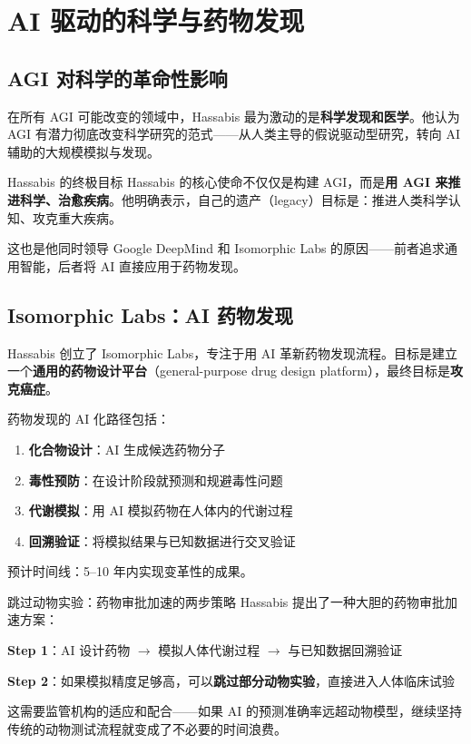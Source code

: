 \section{AI 驱动的科学与药物发现}

\subsection{AGI 对科学的革命性影响}

在所有 AGI 可能改变的领域中，Hassabis 最为激动的是\textbf{科学发现和医学}。他认为 AGI 有潜力彻底改变科学研究的范式——从人类主导的假说驱动型研究，转向 AI 辅助的大规模模拟与发现。

\begin{importantbox}{Hassabis 的终极目标}
Hassabis 的核心使命不仅仅是构建 AGI，而是\textbf{用 AGI 来推进科学、治愈疾病}。他明确表示，自己的遗产（legacy）目标是：推进人类科学认知、攻克重大疾病。

这也是他同时领导 Google DeepMind 和 Isomorphic Labs 的原因——前者追求通用智能，后者将 AI 直接应用于药物发现。
\end{importantbox}

\subsection{Isomorphic Labs：AI 药物发现}

Hassabis 创立了 Isomorphic Labs，专注于用 AI 革新药物发现流程。目标是建立一个\textbf{通用的药物设计平台}（general-purpose drug design platform），最终目标是\textbf{攻克癌症}。

药物发现的 AI 化路径包括：
\begin{enumerate}
    \item \textbf{化合物设计}：AI 生成候选药物分子
    \item \textbf{毒性预防}：在设计阶段就预测和规避毒性问题
    \item \textbf{代谢模拟}：用 AI 模拟药物在人体内的代谢过程
    \item \textbf{回溯验证}：将模拟结果与已知数据进行交叉验证
\end{enumerate}

预计时间线：5--10 年内实现变革性的成果。

\begin{importantbox}{跳过动物实验：药物审批加速的两步策略}
Hassabis 提出了一种大胆的药物审批加速方案：

\textbf{Step 1}：AI 设计药物 $\to$ 模拟人体代谢过程 $\to$ 与已知数据回溯验证

\textbf{Step 2}：如果模拟精度足够高，可以\textbf{跳过部分动物实验}，直接进入人体临床试验

这需要监管机构的适应和配合——如果 AI 的预测准确率远超动物模型，继续坚持传统的动物测试流程就变成了不必要的时间浪费。
\end{importantbox}

